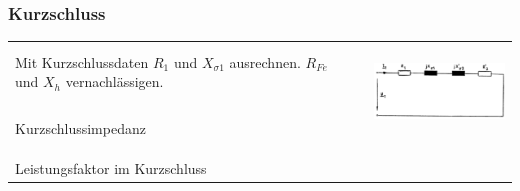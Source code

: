 		\subsubsection{Kurzschluss}
			\begin{tabular}{p{6cm}p{6cm}p{6.5cm}}
            		\begin{minipage}{12cm}
                    	Mit Kurzschlussdaten $R_1$ und $X_{\sigma1}$ ausrechnen. $R_{Fe}$ und $X_h$ vernachlässigen.
                    \end{minipage} 
					& &	
					\multirow{3}{6.5cm}{
	            		\includegraphics[height=2.5cm]{./bilder/KurzschlussErsatzschaltbild.png} } \\
	            \\
				Kurzschlussimpedanz&
					\fbox{$\underline{Z}_k = R_k + jX_k$} \fbox{$Z_k = \frac{U_k}{I_k}$} \\
					& \fbox{$R_k = R_1 + R_2' = \cos{\varphi_k} \cdot Z_k  = \frac{P_k}{I_k^2}$}  \\
					& \fbox{$X_k = X_{\sigma1} + X_{\sigma2}' = \sin{\varphi_k} \cdot Z_k = \frac{Q_k}{I_k^2}$} \\
				Leistungsfaktor im Kurzschluss&
					\fbox{$\cos(\varphi_k) = \frac{P_k}{U_1 \cdot I_k} = \frac{P_k}{S_k}$} \\
             \end{tabular}

